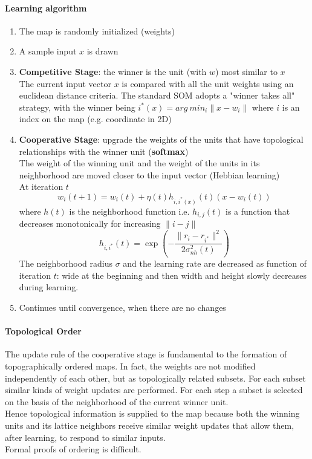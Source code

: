 \documentclass[10pt]{report}
\begin{document}
\paragraph{Learning algorithm}\begin{enumerate}
	\item The map is randomly initialized (weights)
	\item A sample input $x$ is drawn
	\item \textbf{Competitive Stage}: the winner is the unit (with $w$) most similar to $x$\\
The current input vector $x$ is compared with all the unit weights using an euclidean distance criteria. The standard SOM adopts a "winner takes all" strategy, with the winner being $i^*(x) = arg\:min_i\|x-w_i\|$ where $i$ is an index on the map (e.g. coordinate in 2D)
	\item \textbf{Cooperative Stage}: upgrade the weights of the units that have topological relationships with the winner unit (\textbf{softmax})\\
	The weight of the winning unit and the weight of the units in its neighborhood are moved closer to the input vector (Hebbian learning)\\
	At iteration $t$ $$w_i(t+1) = w_i(t) +\eta(t)h_{i,i^*(x)}(t)(x - w_i(t))$$ where $h(t)$ is the neighborhood function i.e. $h_{i,j}(t)$ is a function that decreases monotonically for increasing $\|i-j\|$ $$h_{i,i^*}(t)=\exp\left(-\frac{\|r_i - r_{i^*}\|^2}{2\sigma^2_{nh}(t)}\right)$$
	The neighborhood radius $\sigma$ and the learning rate are decreased as function of iteration $t$: wide at the beginning and then width and height slowly decreases during learning.
	\item Continues until convergence, when there are no changes
\end{enumerate}
\paragraph{Topological Order} The update rule of the cooperative stage is fundamental to the formation of topographically ordered maps. In fact, the weights are not modified independently of each other, but as topologically related subsets. For each subset similar kinds of weight updates are performed. For each step a subset is selected on the basis of the neighborhood of the current winner unit.\\
Hence topological information is supplied to the map because both the winning units and its lattice neighbors receive similar weight updates that allow them, after learning, to respond to similar inputs.\\
Formal proofs of ordering is difficult.
\end{document}
